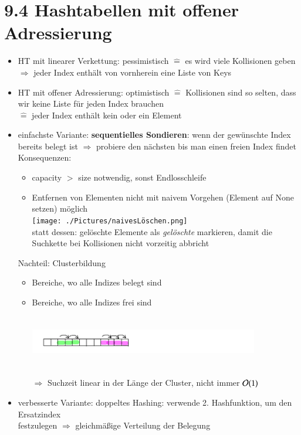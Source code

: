 \section*{9.4 Hashtabellen mit offener Adressierung}
\begin{itemize}
    \item HT mit linearer Verkettung: pessimistisch $\widehat{=}$ es wird viele Kollisionen geben\\ \hspace*{3cm}$\Rightarrow$ jeder Index enthält von vornherein eine Liste von Keys
    \item HT mit offener Adressierung: optimistisch $\widehat{=}$ Kollisionen sind so selten, dass wir keine Liste für jeden Index brauchen\\ \hspace*{3cm}$\widehat{=}$ jeder Index enthält kein oder ein Element
    \item einfachste Variante: \textbf{sequentielles Sondieren}: wenn der gewünschte Index bereits belegt ist $\Rightarrow$ probiere den nächsten bis man einen freien Index findet \\
    Konsequenzen:
    \begin{itemize}
        \item capacity $>$ size notwendig, sonst Endlosschleife
        \item Entfernen von Elementen nicht mit naivem Vorgehen (Element auf None setzen) möglich\\
        \texttt{[image: ./Pictures/naivesLöschen.png]}\\
        statt dessen: gelöschte Elemente als \emph{gelöschte} markieren, damit die Suchkette bei Kollisionen nicht vorzeitig abbricht
    \end{itemize}
    Nachteil: Clusterbildung
    \begin{itemize}
        \item Bereiche, wo alle Indizes belegt sind
        \item Bereiche, wo alle Indizes frei sind\\
        \includegraphics[width=10cm,height=3cm,keepaspectratio]{./Pictures/buntesArray.png}\\
        $\Rightarrow$ Suchzeit linear in der Länge der Cluster, nicht immer $\mathcal{O}{}(1)$
    \end{itemize}
    \item verbesserte Variante: doppeltes Hashing: verwende 2. Hashfunktion, um den Ersatzindex\\ \hspace*{5mm}festzulegen $\Rightarrow$ gleichmäßige Verteilung der Belegung
\end{itemize}

